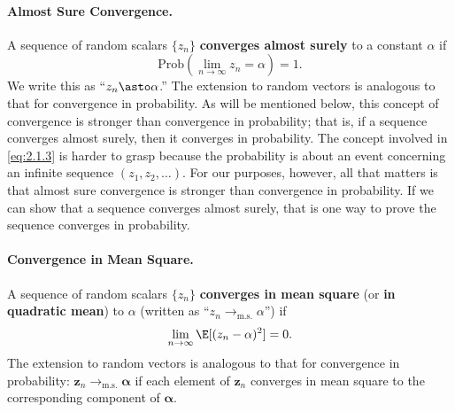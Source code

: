 \paragraph{Almost Sure Convergence.}
A sequence of random scalars $\{z_n\}$ \textbf{converges almost surely} to a constant
$\alpha$ if
\begin{equation}
  \mathrm{Prob}\!\left(\lim_{n \to \infty} z_n = \alpha\right) = 1.
  \label{eq:2.1.3}
\end{equation}
We write this as ``$z_n \asto \alpha$.''  The extension to random vectors is analogous
to that for convergence in probability.  As will be mentioned below, this concept
of convergence is stronger than convergence in probability; that is, if a sequence
converges almost surely, then it converges in probability.  The concept involved
in \eqref{eq:2.1.3} is harder to grasp because the probability is about an event
concerning an infinite sequence $(z_1, z_2, \ldots)$.  For our purposes, however, all
that matters is that almost sure convergence is stronger than convergence in
probability.  If we can show that a sequence converges almost surely, that is one
way to prove the sequence converges in probability.

\paragraph{Convergence in Mean Square.}
A sequence of random scalars $\{z_n\}$ \textbf{converges in mean square} (or
\textbf{in quadratic mean}) to $\alpha$ (written as ``$z_n \to_{\text{m.s.}} \alpha$'') if
\begin{equation}
  \lim_{n \to \infty} \E[(z_n - \alpha)^2] = 0.
  \label{eq:2.1.4}
\end{equation}
The extension to random vectors is analogous to that for convergence in
probability: $\mathbf{z}_n \to_{\text{m.s.}} \bm{\alpha}$ if each element of $\mathbf{z}_n$
converges in mean square to the corresponding component of $\bm{\alpha}$.

